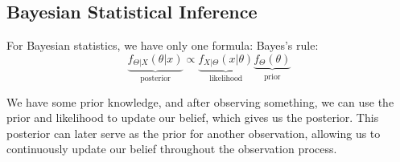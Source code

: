 \subsection{Bayesian Statistical Inference}
For Bayesian statistics, we have only one formula: Bayes’s rule: 
\[
  \underbrace{f_{\Theta \vert X} (\theta \vert x)}_{\text{posterior}} \propto \underbrace{f_{X \vert \Theta} (x \vert \theta)}_{\text{likelihood}} \underbrace{f_{\Theta} (\theta)}_{\text{prior}}
\]

We have some prior knowledge, and after observing something, we can use the prior and likelihood to update our belief, which gives us the posterior. This posterior can later serve as the prior for another observation, allowing us to continuously update our belief throughout the observation process.

